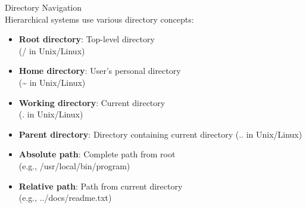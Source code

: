 \begin{code}{Directory Navigation}\\
    Hierarchical systems use various directory concepts:
    \begin{itemize}
        \item \textbf{Root directory}: Top-level directory \\ (/ in Unix/Linux)
        \item \textbf{Home directory}: User's personal directory \\ (\textasciitilde{} in Unix/Linux)
        \item \textbf{Working directory}: Current directory \\ (. in Unix/Linux)
        \item \textbf{Parent directory}: Directory containing current directory (.. in Unix/Linux)
        \item \textbf{Absolute path}: Complete path from root \\ (e.g., /usr/local/bin/program)
        \item \textbf{Relative path}: Path from current directory \\ (e.g., ../docs/readme.txt)
    \end{itemize}
\end{code}



\multend

